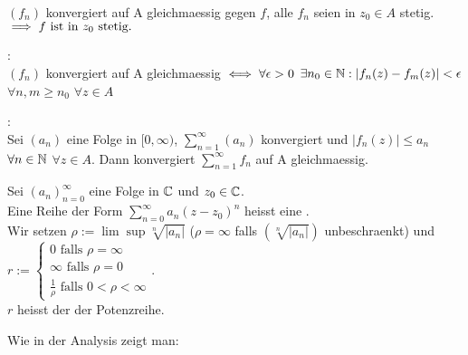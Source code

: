 \documentclass[a4paper,twoside,DIV15,BCOR12mm]{scrbook}
\def\gdw{\equizu}
\def\gdw{\equizu}
\begin{document}
\begin{satz}
 \begin{liste}
  \item $(f_n)$ konvergiert auf A gleichmaessig gegen $f$, alle $f_n$ seien in $z_0 \in A$ stetig. 
    $\implies f \text{ ist in } z_0 \text{ stetig.} $
  \item {}:\\ $(f_n)$ konvergiert auf A gleichmaessig $\gdw \forall\epsilon>0 $ $\exists n_0\in\mathbb{N}:|f_n(z)-f_m(z)|<\epsilon $ $\forall n,m \ge n_0 $ $\forall z\in A$
  \item {}: \\ Sei $(a_n)$ eine Folge in $[0,\infty)$, $\sum\limits_{n=1}^\infty (a_n)$ konvergiert und $|f_n(z)|  \leq a_n $ $\forall n\in\mathbb{N} $ $\forall z\in A$. Dann konvergiert $\sum\limits_{n=1}^\infty f_n$ auf A gleichmaessig.
 \end{liste}
\end{satz}

\begin{definition}
 Sei $(a_n)_{n=0}^\infty$ eine Folge in $\mathbb{C}$ und $z_0 \in \mathbb{C}$. \\
 Eine Reihe der Form $\sum\limits_{n=0}^\infty a_n(z-z_0)^n $ heisst eine . \\
 Wir setzen $\rho :=\lim\sup \sqrt[n]{|a_n|}$ ($\rho = \infty$ falls $(\sqrt[n]{|a_n|})$ unbeschraenkt) und \\
 $r:=\begin{cases} 0 \text{ falls } \rho = \infty \\ \infty \text{ falls } \rho = 0 \\ \frac{1}{\rho} \text{ falls } 0<\rho<\infty \end{cases}$. \\ $r$ heisst der  der Potenzreihe.
\end{definition}
Wie in der Analysis zeigt man:
\end{document}
